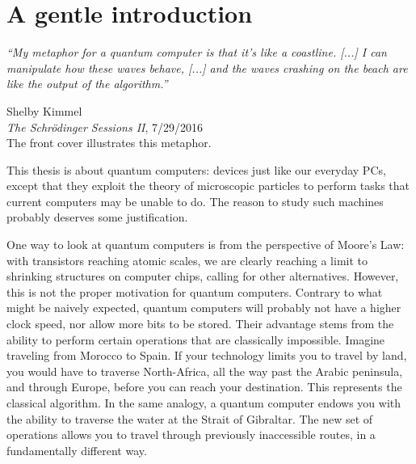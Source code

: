 %
%
%
%
%
%
%
%
%
%
%
%
%


%
%
%



\chapter{A gentle introduction}

%
\hfill \parbox{.6\textwidth}{ \textit{ 
``My metaphor for a quantum computer is that it's like a coastline. {\footnotesize [...]} I can manipulate how these waves behave, {\footnotesize [...]} and the waves crashing on the beach are like the output of the algorithm.''
} %
%
\begin{flushright}
\footnotesize{Shelby Kimmel \\ \textit{The Schr\"{o}dinger Sessions II},  7/29/2016 \\ 
The front cover illustrates this metaphor.}  
\end{flushright}
}
\vspace{.5cm}

%
\noindent
This thesis is about quantum computers: devices just like our everyday PCs, except that they exploit the theory of microscopic particles to perform tasks that current computers may be unable to do. The reason to study such machines probably deserves some justification. 

One way to look at quantum computers is from the perspective of Moore's Law: with transistors reaching atomic scales, we are clearly reaching a limit to shrinking structures on computer chips, calling for other alternatives. However, this is not the proper motivation for quantum computers. Contrary to what might be naively expected, quantum computers will probably not have a higher clock speed, nor allow more bits to be stored. Their advantage stems from the ability to perform certain operations that are classically impossible. Imagine traveling from Morocco to Spain. If your technology limits you to travel by land, you would have to traverse North-Africa, all the way past the Arabic peninsula, and through Europe, before you can reach your destination. This represents the classical algorithm. In the same analogy, a quantum computer endows you with the ability to traverse the water at the Strait of Gibraltar. The new set of operations allows you to travel through previously inaccessible routes, in a fundamentally different way. 


